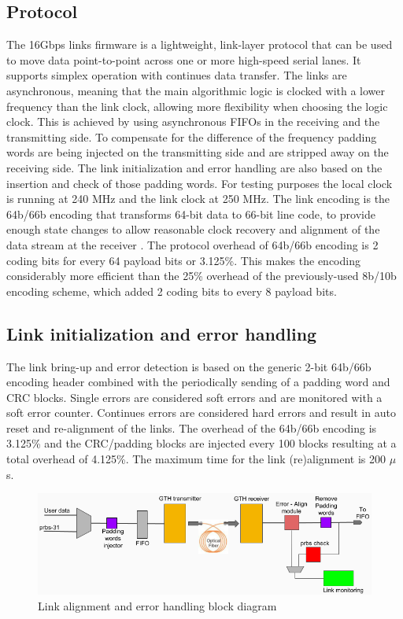 \documentclass[a4paper]{PoS}
\begin{document}
\subsection{Protocol}
The 16Gbps links firmware is a lightweight, link-layer protocol that can be used to move data point-to-point across one or more high-speed serial lanes. It supports simplex operation with continues data transfer. The links are asynchronous, meaning that the main algorithmic logic is clocked with a lower frequency than the link clock, allowing more flexibility when choosing the logic clock. This is achieved by using asynchronous FIFOs in the receiving and the transmitting side. To compensate for the difference of the frequency padding words are being injected on the transmitting side and are stripped away on the receiving side. The link initialization and error handling are also based on the insertion and check of those padding words. For testing purposes the local clock is running at 240 MHz and the link clock at 250 MHz. The link encoding is the 64b/66b encoding that transforms 64-bit data to 66-bit line code, to provide enough state changes to allow reasonable clock recovery and alignment of the data stream at the receiver \cite{walker200064b}. The protocol overhead of 64b/66b encoding is 2 coding bits for every 64 payload bits or 3.125\%. This makes the encoding considerably more efficient than the 25\% overhead of the previously-used 8b/10b encoding scheme, which added 2 coding bits to every 8 payload bits.



\subsection{Link initialization and error handling}
The link bring-up and error detection is based on the generic 2-bit 64b/66b encoding header combined with the periodically sending of a padding word and CRC blocks. Single errors are considered soft errors and are monitored with a soft error counter. Continues errors are considered hard errors and result in auto reset and re-alignment of the links. 
The overhead of the 64b/66b encoding is 3.125\% and the CRC/padding blocks are injected every 100 blocks resulting at a total overhead of 4.125\%. The maximum time for the link (re)alignment is 200 $\mu$ s.

\begin{figure}
\centering
\includegraphics[width=1\textwidth]{link_align.png}
\caption{Link alignment and error handling block diagram}
\label{align}
\end{figure}
\end{document}
